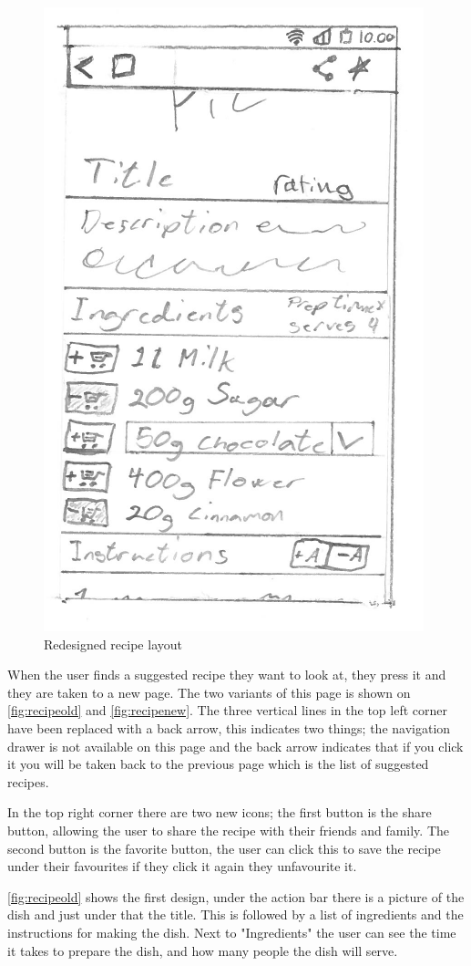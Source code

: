 \begin{figure}[H]
\begin{minipage}[b]{0.5\columnwidth}
\centering
\includegraphics[width=0.7\columnwidth]{img/prototypes/recipe_new.pdf}
\caption{Redesigned recipe layout\label{fig:recipenew}}
\end{minipage}
\end{figure}

When the user finds a suggested recipe they want to look at, they press it and they are taken to a new page. The two variants of this page is shown on \autoref{fig:recipeold} and \autoref{fig:recipenew}. The three vertical lines in the top left corner have been replaced with a back arrow, this indicates two things; the navigation drawer is not available on this page and the back arrow indicates that if you click it you will be taken back to the previous page which is the list of suggested recipes. 

In the top right corner there are two new icons; the first button is the share button, allowing the user to share the recipe with their friends and family. The second button is the favorite button, the user can click this to save the recipe under their favourites if they click it again they unfavourite it.

\autoref{fig:recipeold} shows the first design, under the action bar there is a picture of the dish and just under that the title. This is followed by a list of ingredients and the instructions for making the dish. Next to "Ingredients" the user can see the time it takes to prepare the dish, and how many people the dish will serve. 

